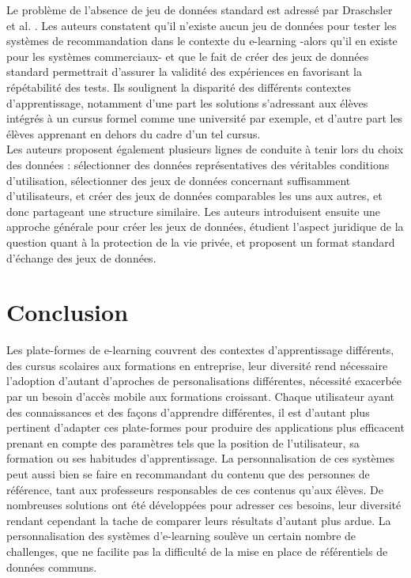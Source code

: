 \documentclass[conference]{./sty/IEEEtran}
\begin{document}
Le problème de l'absence de jeu de données standard est adressé par Draschsler et al. \cite{DBLP:journals/procedia/DrachslerBVVDMBLSFW10}. Les auteurs constatent qu'il n'existe aucun jeu de données pour tester les systèmes de recommandation dans le contexte du e-learning -alors qu'il en existe pour les systèmes commerciaux- et que le fait de créer des jeux de données standard permettrait d'assurer la validité des expériences en favorisant la répétabilité des tests. Ils soulignent la disparité des différents contextes d'apprentissage, notamment d'une part les solutions s'adressant aux élèves intégrés à un cursus formel comme une université par exemple, et d'autre part les élèves apprenant en dehors du cadre d'un tel cursus.\\
Les auteurs proposent également plusieurs lignes de conduite à tenir lors du choix des données : sélectionner des données représentatives des véritables conditions d'utilisation, sélectionner des jeux de données concernant suffisamment d'utilisateurs, et créer des jeux de données comparables les uns aux autres, et donc partageant une structure similaire. Les auteurs introduisent ensuite une approche générale pour créer les jeux de données, étudient l'aspect juridique de la question quant à la protection de la vie privée, et proposent un format standard d'échange des jeux de données.\\



\section{Conclusion}
Les plate-formes de e-learning couvrent des contextes d'apprentissage différents, des cursus scolaires aux formations en entreprise, leur diversité rend nécessaire l'adoption d'autant d'aproches de personalisations différentes, nécessité exacerbée par un besoin d'accès mobile aux formations croissant. Chaque utilisateur ayant des connaissances et des façons d'apprendre différentes, il est d'autant plus pertinent d'adapter ces plate-formes pour produire des applications plus efficacent prenant en compte des paramètres tels que la position de l'utilisateur, sa formation ou ses habitudes d'apprentissage.  La personnalisation de ces systèmes peut aussi bien se faire en recommandant du contenu que des personnes de référence, tant aux professeurs responsables de ces contenus qu'aux élèves. De nombreuses solutions ont été développées pour adresser ces besoins, leur diversité rendant cependant la tache de comparer leurs résultats d'autant plus ardue. La personnalisation des systèmes d'e-learning soulève un certain nombre de challenges, que ne facilite pas la difficulté de la mise en place de référentiels de données communs.




\end{document}
